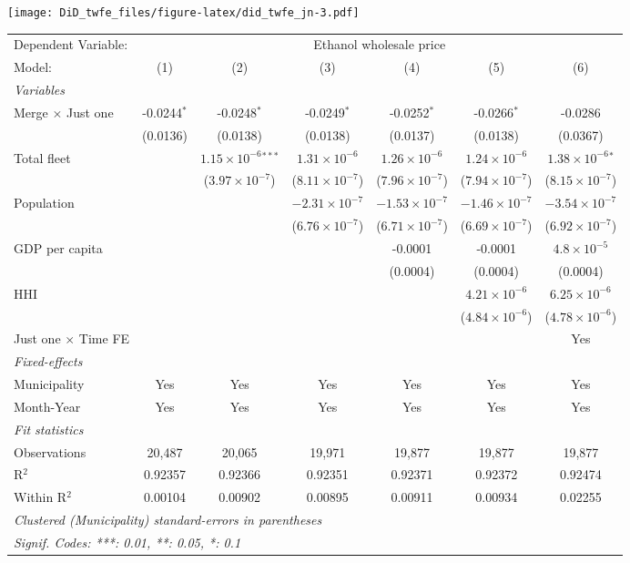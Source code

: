 \documentclass[
]{article}
\begin{document}
\texttt{[image: DiD\_twfe\_files/figure-latex/did\_twfe\_jn-3.pdf]}

\begin{tabular}{lcccccc}
\tabularnewline\midrule\midrule
Dependent Variable:&\multicolumn{6}{c}{Ethanol wholesale price}\\
Model:&(1) & (2) & (3) & (4) & (5) & (6)\\
\midrule \emph{Variables}&   &   &   &   &   &  \\
Merge $\times $ Just one & -0.0244$^{*}$ & -0.0248$^{*}$ & -0.0249$^{*}$ & -0.0252$^{*}$ & -0.0266$^{*}$ & -0.0286\\
  &(0.0136) & (0.0138) & (0.0138) & (0.0137) & (0.0138) & (0.0367)\\
Total fleet &    & $1.15\times 10^{-6}$$^{***}$ & $1.31\times 10^{-6}$ & $1.26\times 10^{-6}$ & $1.24\times 10^{-6}$ & $1.38\times 10^{-6}$$^{*}$\\
  &   & ($3.97\times 10^{-7}$) & ($8.11\times 10^{-7}$) & ($7.96\times 10^{-7}$) & ($7.94\times 10^{-7}$) & ($8.15\times 10^{-7}$)\\
Population &    &    & $-2.31\times 10^{-7}$ & $-1.53\times 10^{-7}$ & $-1.46\times 10^{-7}$ & $-3.54\times 10^{-7}$\\
  &   &    & ($6.76\times 10^{-7}$) & ($6.71\times 10^{-7}$) & ($6.69\times 10^{-7}$) & ($6.92\times 10^{-7}$)\\
GDP per capita &    &    &    & -0.0001 & -0.0001 & $4.8\times 10^{-5}$\\
  &   &    &    & (0.0004) & (0.0004) & (0.0004)\\
HHI &    &    &    &    & $4.21\times 10^{-6}$ & $6.25\times 10^{-6}$\\
  &   &    &    &    & ($4.84\times 10^{-6}$) & ($4.78\times 10^{-6}$)\\
Just one $\times$ Time FE &  &  &  &  &  & Yes\\
\midrule \emph{Fixed-effects}&   &   &   &   &   &  \\
Municipality & Yes & Yes & Yes & Yes & Yes & Yes\\
Month-Year & Yes & Yes & Yes & Yes & Yes & Yes\\
\midrule \emph{Fit statistics}&  & & & & & \\
Observations & 20,487&20,065&19,971&19,877&19,877&19,877\\
R$^2$ & 0.92357&0.92366&0.92351&0.92371&0.92372&0.92474\\
Within R$^2$ & 0.00104&0.00902&0.00895&0.00911&0.00934&0.02255\\
\midrule\midrule\multicolumn{7}{l}{\emph{Clustered (Municipality) standard-errors in parentheses}}\\
\multicolumn{7}{l}{\emph{Signif. Codes: ***: 0.01, **: 0.05, *: 0.1}}\\
\end{tabular}
\end{document}
